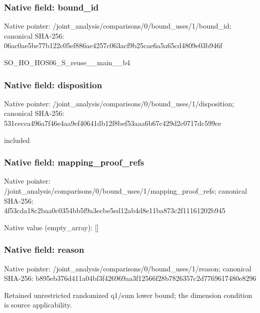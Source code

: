 \documentclass[10pt,a4paper]{article}
\begin{document}
\subsubsection{Native field: bound\_\allowbreak{}id}
Native pointer: /joint\_\allowbreak{}analysis/comparisons/0/bound\_\allowbreak{}uses/1/bound\_\allowbreak{}id; canonical SHA-256: 06ac0ae5be77b122c05ef886ae4257c063acf9b25cae6a5a65cd4809e03b946f

\begingroup\raggedright\sloppy SO\_\allowbreak{}HO\_\allowbreak{}HOS06\_\allowbreak{}S\_\allowbreak{}reuse\_\allowbreak{}\_\allowbreak{}main\_\allowbreak{}\_\allowbreak{}b4\par\endgroup

\subsubsection{Native field: disposition}
Native pointer: /joint\_\allowbreak{}analysis/comparisons/0/bound\_\allowbreak{}uses/1/disposition; canonical SHA-256: 531cecca496a7f46e4aa9ef40641db12f8bef53aaa6b67c429d2c0717dc599ce

\begingroup\raggedright\sloppy included\par\endgroup

\subsubsection{Native field: mapping\_\allowbreak{}proof\_\allowbreak{}refs}
Native pointer: /joint\_\allowbreak{}analysis/comparisons/0/bound\_\allowbreak{}uses/1/mapping\_\allowbreak{}proof\_\allowbreak{}refs; canonical SHA-256: 4f53cda18c2baa0c0354bb5f9a3ecbe5ed12ab4d8e11ba873c2f11161202b945

Native value (empty\_\allowbreak{}array): []

\subsubsection{Native field: reason}
Native pointer: /joint\_\allowbreak{}analysis/comparisons/0/bound\_\allowbreak{}uses/1/reason; canonical SHA-256: b895eb376d411a04bf3f426969aa3f12566f28b7826357c2d7769617480e8296

\begingroup\raggedright\sloppy Retained unrestricted randomized q1/\allowbreak{}sum lower bound;\allowbreak{} the dimension condition is source applicability.\par\endgroup
\end{document}
